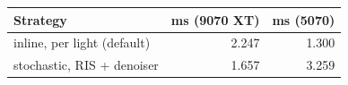 \begin{tabular}{lrr}
\toprule
Strategy & ms (9070 XT) & ms (5070) \\
\midrule
inline, per light (default) & 2.247 & 1.300 \\
stochastic, RIS + denoiser & 1.657 & 3.259 \\
\bottomrule
\end{tabular}
